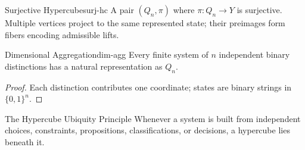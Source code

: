 \begin{definition}{Surjective Hypercube}{surj-hc}
  A pair $(Q_n, \pi)$ where $\pi : Q_n \to Y$ is surjective.
  Multiple vertices project to the same represented state; their preimages
  form fibers encoding admissible lifts.
\end{definition}

\begin{theorem}{Dimensional Aggregation}{dim-agg}
  Every finite system of $n$ independent binary distinctions has a natural
  representation as $Q_n$.
\end{theorem}
\begin{proof}Each distinction contributes one coordinate; states are binary
strings in $\{0,1\}^n$.\end{proof}

\begin{namedthm}{The Hypercube Ubiquity Principle}
  Whenever a system is built from independent choices, constraints,
  propositions, classifications, or decisions, a hypercube lies beneath it.
\end{namedthm}
